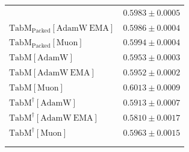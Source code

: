 \begin{longtable}{p{}p{}}
{\begin{tabular}{ll}
{\footnotesize $\mathrm{TabM_{\text{Packed}}[AdamW]}$ } & {\footnotesize$0.5983 \pm 0.0005$}\\ 
{\footnotesize $\mathrm{TabM_{\text{Packed}}[AdamW\ EMA]}$ } & {\footnotesize$0.5986 \pm 0.0004$}\\ 
{\footnotesize $\mathrm{TabM_{\text{Packed}}[Muon]}$ } & {\footnotesize$0.5994 \pm 0.0004$}\\ 
{\footnotesize $\mathrm{TabM[AdamW]}$ } & {\footnotesize$0.5953 \pm 0.0003$}\\ 
{\footnotesize $\mathrm{TabM[AdamW\ EMA]}$ } & {\footnotesize$0.5952 \pm 0.0002$}\\ 
{\footnotesize $\mathrm{TabM[Muon]}$ } & {\footnotesize$0.6013 \pm 0.0009$}\\ 
{\footnotesize $\mathrm{TabM^\dagger[AdamW]}$ } & {\footnotesize$0.5913 \pm 0.0007$}\\ 
{\footnotesize $\mathrm{TabM^\dagger[AdamW\ EMA]}$ } & {\footnotesize$0.5810 \pm 0.0017$}\\ 
{\footnotesize $\mathrm{TabM^\dagger[Muon]}$ } & {\footnotesize$0.5963 \pm 0.0015$}\\ 
\bottomrule
\end{tabular}}

\\
\topalign{
\centering
\setlength\tabcolsep{2.5pt}
\renewcommand{\arraystretch}{0.8}
\begin{tabular}{ll}


\end{tabular}}
\end{longtable}
